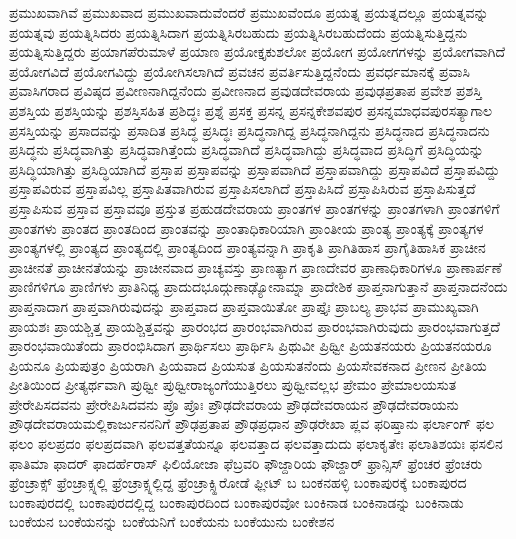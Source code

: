 {ಪ್ರಮುಖವಾಗಿವೆ
ಪ್ರಮುಖವಾದ
ಪ್ರಮುಖವಾದುವೆಂದರೆ
ಪ್ರಮುಖವೆಂದೂ
ಪ್ರಯತ್ನ
ಪ್ರಯತ್ನದಲ್ಲೂ
ಪ್ರಯತ್ನವನ್ನು
ಪ್ರಯತ್ನವು
ಪ್ರಯತ್ನಿಸಿದರು
ಪ್ರಯತ್ನಿಸಿದಾಗ
ಪ್ರಯತ್ನಿಸಿರಬಹುದು
ಪ್ರಯತ್ನಿಸಿರಬಹುದೆಂದು
ಪ್ರಯತ್ನಿಸುತ್ತಿದ್ದನು
ಪ್ರಯತ್ನಿಸುತ್ತಿದ್ದರು
ಪ್ರಯಾಗಪೆರುಮಾಳೆ
ಪ್ರಯಾಣ
ಪ್ರಯೋಕ್ತೃಕುಶಲೋ
ಪ್ರಯೋಗ
ಪ್ರಯೋಗಗಳನ್ನು
ಪ್ರಯೋಗವಾಗಿದೆ
ಪ್ರಯೋಗವಿದೆ
ಪ್ರಯೋಗವಿದ್ದು
ಪ್ರಯೋಗಿಸಲಾಗಿದೆ
ಪ್ರವಚನ
ಪ್ರವರ್ತಿಸುತ್ತಿದ್ದನೆಂದು
ಪ್ರವರ್ಧಮಾನಕ್ಕೆ
ಪ್ರವಾಸಿ
ಪ್ರವಾಸಿಗರಾದ
ಪ್ರವಿಷ್ಠದ
ಪ್ರವೀಣನಾಗಿದ್ದನೆಂದು
ಪ್ರವೀಣನಾದ
ಪ್ರವುಡದೇವರಾಯ
ಪ್ರವುಢಪ್ರತಾಪ
ಪ್ರವೇಶ
ಪ್ರಶಸ್ತಿ
ಪ್ರಶಸ್ತಿಯ
ಪ್ರಶಸ್ತಿಯನ್ನು
ಪ್ರಶಸ್ತಿಸಹಿತ
ಪ್ರಶಿದ್ಧಃ
ಪ್ರಶ್ನೆ
ಪ್ರಸಕ್ತ
ಪ್ರಸನ್ನ
ಪ್ರಸನ್ನಕೇಶವಪುರ
ಪ್ರಸನ್ನಮಾಧವಪುರಸತ್ಯಾಗಾಲ
ಪ್ರಸಸ್ತಿಯನ್ನು
ಪ್ರಸಾದವನ್ನು
ಪ್ರಸಾದಿತ
ಪ್ರಸಿದ್ಧ
ಪ್ರಸಿದ್ಧಃ
ಪ್ರಸಿದ್ಧನಾಗಿದ್ದ
ಪ್ರಸಿದ್ಧನಾಗಿದ್ದನು
ಪ್ರಸಿದ್ಧನಾದ
ಪ್ರಸಿದ್ಧನಾದನು
ಪ್ರಸಿದ್ಧನು
ಪ್ರಸಿದ್ಧವಾಗಿತ್ತು
ಪ್ರಸಿದ್ಧವಾಗಿತ್ತೆಂದು
ಪ್ರಸಿದ್ಧವಾಗಿದೆ
ಪ್ರಸಿದ್ಧವಾಗಿದ್ದು
ಪ್ರಸಿದ್ಧವಾದ
ಪ್ರಸಿದ್ಧಿಗೆ
ಪ್ರಸಿದ್ಧಿಯನ್ನು
ಪ್ರಸಿದ್ಧಿಯಾಗಿತ್ತು
ಪ್ರಸಿದ್ಧಿಯಾಗಿದೆ
ಪ್ರಸ್ತಾಪ
ಪ್ರಸ್ತಾಪವನ್ನು
ಪ್ರಸ್ತಾಪವಾಗಿದೆ
ಪ್ರಸ್ತಾಪವಾಗಿದ್ದು
ಪ್ರಸ್ತಾಪವಿದೆ
ಪ್ರಸ್ತಾಪವಿದ್ದು
ಪ್ರಸ್ತಾಪವಿರುವ
ಪ್ರಸ್ತಾಪವಿಲ್ಲ
ಪ್ರಸ್ತಾಪಿತವಾಗಿರುವ
ಪ್ರಸ್ತಾಪಿಸಲಾಗಿದೆ
ಪ್ರಸ್ತಾಪಿಸಿದೆ
ಪ್ರಸ್ತಾಪಿಸಿರುವ
ಪ್ರಸ್ತಾಪಿಸುತ್ತದೆ
ಪ್ರಸ್ತಾಪಿಸುವ
ಪ್ರಸ್ತಾವ
ಪ್ರಸ್ತಾವವೂ
ಪ್ರಸ್ತುತ
ಪ್ರಹುಡದೇವರಾಯ
ಪ್ರಾಂತಗಳ
ಪ್ರಾಂತಗಳನ್ನು
ಪ್ರಾಂತಗಳಾಗಿ
ಪ್ರಾಂತಗಳಿಗೆ
ಪ್ರಾಂತಗಳು
ಪ್ರಾಂತದ
ಪ್ರಾಂತದಿಂದ
ಪ್ರಾಂತವನ್ನು
ಪ್ರಾಂತಾಧಿಕಾರಿಯಾಗಿ
ಪ್ರಾಂತೀಯ
ಪ್ರಾಂತ್ಯ
ಪ್ರಾಂತ್ಯಕ್ಕೆ
ಪ್ರಾಂತ್ಯಗಳ
ಪ್ರಾಂತ್ಯಗಳಲ್ಲಿ
ಪ್ರಾಂತ್ಯದ
ಪ್ರಾಂತ್ಯದಲ್ಲಿ
ಪ್ರಾಂತ್ಯದಿಂದ
ಪ್ರಾಂತ್ಯವನ್ನಾಗಿ
ಪ್ರಾಕೃತಿ
ಪ್ರಾಗಿತಿಹಾಸ
ಪ್ರಾಗೈತಿಹಾಸಿಕ
ಪ್ರಾಚೀನ
ಪ್ರಾಚೀನತೆ
ಪ್ರಾಚೀನತೆಯನ್ನು
ಪ್ರಾಚೀನವಾದ
ಪ್ರಾಚ್ಯವಸ್ತು
ಪ್ರಾಣತ್ಯಾಗ
ಪ್ರಾಣದೇವರ
ಪ್ರಾಣಾಧಿಕಾರಿಗಳೂ
ಪ್ರಾಣಾರ್ಪಣೆ
ಪ್ರಾಣಿಗಳಿಗೂ
ಪ್ರಾಣಿಗಳು
ಪ್ರಾತಿನಿಧ್ಯ
ಪ್ರಾದುದಭೂದ್ಗುಣಾಢ್ಯೋನಾಮ್ನಾ
ಪ್ರಾದೇಶಿಕ
ಪ್ರಾಪ್ತನಾಗುತ್ತಾನೆ
ಪ್ರಾಪ್ತನಾದನೆಂದು
ಪ್ರಾಪ್ತನಾದಾಗ
ಪ್ರಾಪ್ತವಾಗಿರುವುದನ್ನು
ಪ್ರಾಪ್ತವಾದ
ಪ್ರಾಪ್ತವಾಯಿತೋ
ಪ್ರಾಪ್ತೈಃ
ಪ್ರಾಬಲ್ಯ
ಪ್ರಾಭವ
ಪ್ರಾಮುಖ್ಯವಾಗಿ
ಪ್ರಾಯಶಃ
ಪ್ರಾಯಶ್ಚಿತ್ತ
ಪ್ರಾಯಶ್ಚಿತ್ತವನ್ನು
ಪ್ರಾರಂಭದ
ಪ್ರಾರಂಭವಾಗಿರುವ
ಪ್ರಾರಂಭವಾಗಿರುವುದು
ಪ್ರಾರಂಭವಾಗುತ್ತದೆ
ಪ್ರಾರಂಭವಾಯಿತೆಂದು
ಪ್ರಾರಂಭಿಸಿದಾಗ
ಪ್ರಾರ್ಥಿಸಲು
ಪ್ರಾರ್ಥಿಸಿ
ಪ್ರಿಥುವೀ
ಪ್ರಿಥ್ವೀ
ಪ್ರಿಯತನಯರು
ಪ್ರಿಯತನಯರೂ
ಪ್ರಿಯನೂ
ಪ್ರಿಯಪುತ್ರಂ
ಪ್ರಿಯರಾಗಿ
ಪ್ರಿಯವಾದ
ಪ್ರಿಯಸುತ
ಪ್ರಿಯಸುತನೆಂದು
ಪ್ರಿಯಸೇವಕನಾದ
ಪ್ರೀಣನ
ಪ್ರೀತಿಯ
ಪ್ರೀತಿಯಿಂದ
ಪ್ರೀತ್ಯರ್ಥವಾಗಿ
ಪ್ರುಥ್ವೀ
ಪ್ರುಥ್ವೀರಾಜ್ಯಂಗೆಯುತ್ತಿರಲು
ಪ್ರುಥ್ವೀವಲ್ಲಭ
ಪ್ರೇಮಂ
ಪ್ರೇಮಾಲಯಸುತ
ಪ್ರೇರೇಪಿಸದವನು
ಪ್ರೇರೇಪಿಸಿದವನು
ಪ್ರೊ
ಪ್ರೊಃ
ಪ್ರೌಢದೇವರಾಯ
ಪ್ರೌಢದೇವರಾಯನ
ಪ್ರೌಢದೇವರಾಯನು
ಪ್ರೌಢದೇವರಾಯಮಲ್ಲಿಕಾರ್ಜುನನನಿಗೆ
ಪ್ರೌಢಪ್ರತಾಪ
ಪ್ರೌಢಪ್ರಧಾನ
ಪ್ರೌಢರೇಖಾ
ಪ್ಲವ
ಫರಿಷ್ತಾನು
ಫರ್ಲಾಂಗ್
ಫಲ
ಫಲಂ
ಫಲಪ್ರದಂ
ಫಲಪ್ರದವಾಗಿ
ಫಲವತ್ತತೆಯನ್ನೂ
ಫಲವತ್ತಾದ
ಫಲವತ್ತಾದುದು
ಫಲಾಕೃತೇಃ
ಫಲಾತಿಶಯಃ
ಫಸಲಿನ
ಫಾತಿಮಾ
ಫಾದರ್
ಫಾದರ್ಹೆರಾಸ್
ಫಿಲಿಯೋಜಾ
ಫೆಬ್ರವರಿ
ಫೌಜ್ದಾರಿಯ
ಫೌಜ್ದಾರ್
ಫ್ರಾನ್ಸಿಸ್
ಫ್ರೆಂಚರ
ಫ್ರೆಂಚರು
ಫ್ರೆಂಚ್ರಾಕ್ಸ್
ಫ್ರೆಂಚ್ರಾಕ್ಸ್ನಲ್ಲಿ
ಫ್ರೆಂಚ್ರಾಕ್ಸ್ನಲ್ಲಿದ್ದ
ಫ್ರೆಂಚ್ರಾಕ್ಸ್ಹಿರೋಡೆ
ಫ್ಲೀಟ್
ಬ
ಬಂಕನಹಳ್ಳಿ
ಬಂಕಾಪುರಕ್ಕೆ
ಬಂಕಾಪುರದ
ಬಂಕಾಪುರದಲ್ಲಿ
ಬಂಕಾಪುರದಲ್ಲಿದ್ದ
ಬಂಕಾಪುರದಿಂದ
ಬಂಕಾಪುರವೋ
ಬಂಕಿನಾಡ
ಬಂಕಿನಾಡನ್ನು
ಬಂಕಿನಾಡು
ಬಂಕೆಯನ
ಬಂಕೆಯನನ್ನು
ಬಂಕೆಯನಿಗೆ
ಬಂಕೆಯನು
ಬಂಕೆಯುನು
ಬಂಕೇಶನ
}
